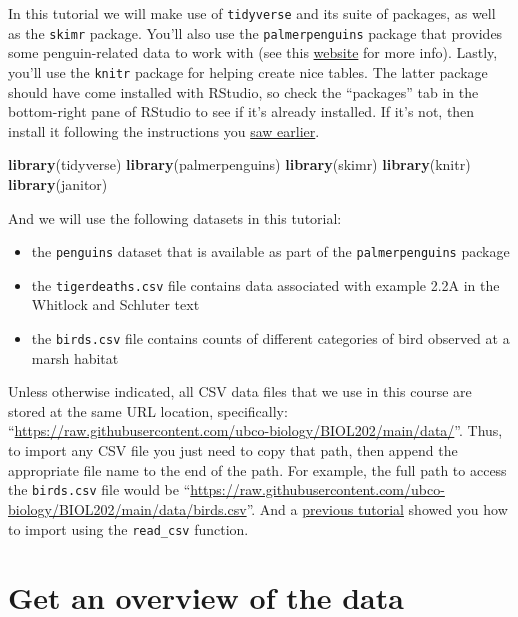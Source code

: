 \documentclass[
]{book}
\newenvironment{Shaded}{\begin{snugshade}}{\end{snugshade}}
\newcommand{\FunctionTok}[1]{\textcolor[rgb]{0.13,0.29,0.53}{\textbf{#1}}}
\newcommand{\NormalTok}[1]{#1}
\providecommand{\tightlist}{%
  \setlength{\itemsep}{0pt}\setlength{\parskip}{0pt}}
\begin{document}
In this tutorial we will make use of \texttt{tidyverse} and its suite of packages, as well as the \texttt{skimr} package. You'll also use the \texttt{palmerpenguins} package that provides some penguin-related data to work with (see this \href{https://allisonhorst.github.io/palmerpenguins/}{website} for more info). Lastly, you'll use the \texttt{knitr} package for helping create nice tables. The latter package should have come installed with RStudio, so check the ``packages'' tab in the bottom-right pane of RStudio to see if it's already installed. If it's not, then install it following the instructions you \hyperref[package_install]{saw earlier}.

\begin{Shaded}
\begin{Highlighting}[]
\FunctionTok{library}\NormalTok{(tidyverse)}
\FunctionTok{library}\NormalTok{(palmerpenguins)}
\FunctionTok{library}\NormalTok{(skimr)}
\FunctionTok{library}\NormalTok{(knitr)}
\FunctionTok{library}\NormalTok{(janitor)}
\end{Highlighting}
\end{Shaded}

And we will use the following datasets in this tutorial:

\begin{itemize}
\tightlist
\item
  the \texttt{penguins} dataset that is available as part of the \texttt{palmerpenguins} package
\item
  the \texttt{tigerdeaths.csv} file contains data associated with example 2.2A in the Whitlock and Schluter text
\item
  the \texttt{birds.csv} file contains counts of different categories of bird observed at a marsh habitat
\end{itemize}

Unless otherwise indicated, all CSV data files that we use in this course are stored at the same URL location, specifically: ``\url{https://raw.githubusercontent.com/ubco-biology/BIOL202/main/data/}''. Thus, to import any CSV file you just need to copy that path, then append the appropriate file name to the end of the path. For example, the full path to access the \texttt{birds.csv} file would be ``\url{https://raw.githubusercontent.com/ubco-biology/BIOL202/main/data/birds.csv}''. And a \hyperref[import_csv_url]{previous tutorial} showed you how to import using the \texttt{read\_csv} function.

\section{Get an overview of the data}\label{vis_data_overview}
\end{document}

